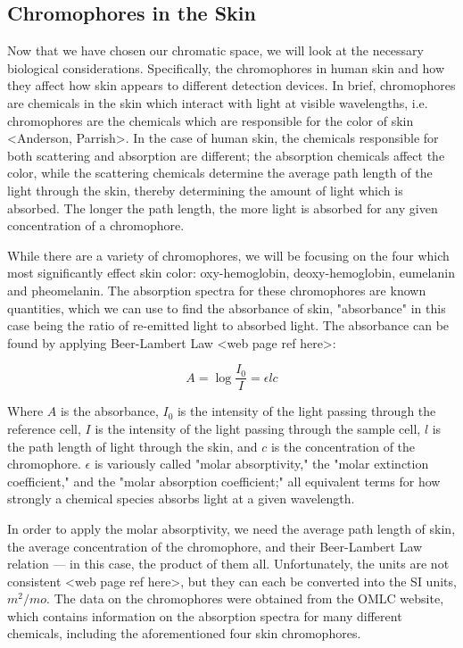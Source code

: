 \subsection{Chromophores in the Skin}

Now that we have chosen our chromatic space, we will look at the necessary biological considerations. Specifically, the chromophores in human skin and how they affect how skin appears to different detection devices. In brief, chromophores are chemicals in the skin which interact with light at visible wavelengths, i.e. chromophores are the chemicals which are responsible for the color of skin <Anderson, Parrish>. In the case of human skin, the chemicals responsible for both scattering and absorption are different; the absorption chemicals affect the color, while the scattering chemicals determine the average path length of the light through the skin, thereby determining the amount of light which is absorbed. The longer the path length, the more light is absorbed for any given concentration of a chromophore. 

While there are a variety of chromophores, we will be focusing on the four which most significantly effect skin color: oxy-hemoglobin, deoxy-hemoglobin, eumelanin and pheomelanin. The absorption spectra for these chromophores are known quantities, which we can use to find the absorbance of skin, "absorbance" in this case being the ratio of re-emitted light to absorbed light. The absorbance can be found by applying Beer-Lambert Law <web page ref here>:

\begin{equation}\label{eq:BeerLambert}
A = \log \frac{I_{0}}{I} = \epsilon l  c 
\end{equation}

Where $A$ is the absorbance, $I_{0}$ is the intensity of the light passing through the reference cell, $I$ is the intensity of the light passing through the sample cell, $l$ is the path length of light through the skin, and $c$ is the concentration of the chromophore. $\epsilon$ is variously called "molar absorptivity," the "molar extinction coefficient," and the "molar absorption coefficient;" all equivalent terms for how strongly a chemical species absorbs light at a given wavelength.

In order to apply the molar absorptivity, we need the average path length of skin, the average concentration of the chromophore, and their Beer-Lambert Law relation --- in this case, the product of them all. Unfortunately, the units are not consistent <web page ref here>, but they can each be converted into the SI units, $m^{2}/mo$. The data on the chromophores were obtained from the OMLC website, which contains information on the absorption spectra for many different chemicals, including the aforementioned four skin chromophores. 

